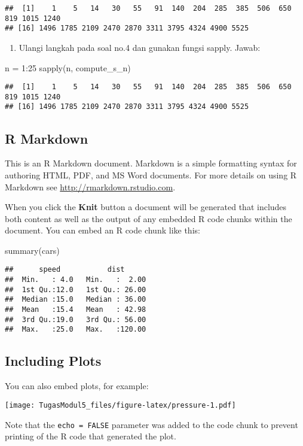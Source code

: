 \documentclass[
]{article}
\newenvironment{Shaded}{\begin{snugshade}}{\end{snugshade}}
\newcommand{\DecValTok}[1]{\textcolor[rgb]{0.00,0.00,0.81}{#1}}
\newcommand{\FunctionTok}[1]{\textcolor[rgb]{0.00,0.00,0.00}{#1}}
\newcommand{\NormalTok}[1]{#1}
\newcommand{\OtherTok}[1]{\textcolor[rgb]{0.56,0.35,0.01}{#1}}
\newcommand{\SpecialCharTok}[1]{\textcolor[rgb]{0.00,0.00,0.00}{#1}}
\providecommand{\tightlist}{%
  \setlength{\itemsep}{0pt}\setlength{\parskip}{0pt}}
\begin{document}
\begin{verbatim}
##  [1]    1    5   14   30   55   91  140  204  285  385  506  650  819 1015 1240
## [16] 1496 1785 2109 2470 2870 3311 3795 4324 4900 5525
\end{verbatim}

\begin{enumerate}
\def\labelenumi{\arabic{enumi}.}
\setcounter{enumi}{4}
\tightlist
\item
  Ulangi langkah pada soal no.4 dan gunakan fungsi sapply. Jawab:
\end{enumerate}

\begin{Shaded}
\begin{Highlighting}[]
\NormalTok{n }\OtherTok{=} \DecValTok{1}\SpecialCharTok{:}\DecValTok{25}
\FunctionTok{sapply}\NormalTok{(n, compute\_s\_n)}
\end{Highlighting}
\end{Shaded}

\begin{verbatim}
##  [1]    1    5   14   30   55   91  140  204  285  385  506  650  819 1015 1240
## [16] 1496 1785 2109 2470 2870 3311 3795 4324 4900 5525
\end{verbatim}

\hypertarget{r-markdown}{%
\subsection{R Markdown}\label{r-markdown}}

This is an R Markdown document. Markdown is a simple formatting syntax
for authoring HTML, PDF, and MS Word documents. For more details on
using R Markdown see \url{http://rmarkdown.rstudio.com}.

When you click the \textbf{Knit} button a document will be generated
that includes both content as well as the output of any embedded R code
chunks within the document. You can embed an R code chunk like this:

\begin{Shaded}
\begin{Highlighting}[]
\FunctionTok{summary}\NormalTok{(cars)}
\end{Highlighting}
\end{Shaded}

\begin{verbatim}
##      speed           dist       
##  Min.   : 4.0   Min.   :  2.00  
##  1st Qu.:12.0   1st Qu.: 26.00  
##  Median :15.0   Median : 36.00  
##  Mean   :15.4   Mean   : 42.98  
##  3rd Qu.:19.0   3rd Qu.: 56.00  
##  Max.   :25.0   Max.   :120.00
\end{verbatim}

\hypertarget{including-plots}{%
\subsection{Including Plots}\label{including-plots}}

You can also embed plots, for example:

\texttt{[image: TugasModul5\_files/figure-latex/pressure-1.pdf]}

Note that the \texttt{echo\ =\ FALSE} parameter was added to the code
chunk to prevent printing of the R code that generated the plot.
\end{document}
